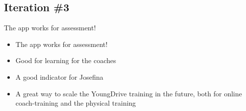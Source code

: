 \subsection{Iteration \#3}

  The app works for assessment!

  \begin{itemize}
    \item The app works for assessment!
    \item Good for learning for the coaches
    \item A good indicator for Josefina
    \item A great way to scale the YoungDrive training in the future, both for online coach-training and the physical training
  \end{itemize}
